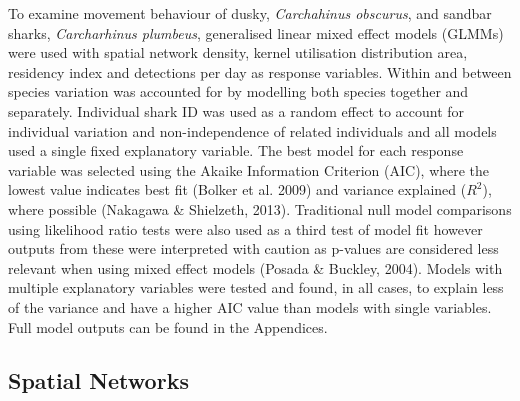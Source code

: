 \documentclass[11pt,a4paper]{article}
\begin{document}
	To examine movement behaviour of dusky, \textit{Carchahinus obscurus}, and sandbar sharks, \textit{Carcharhinus plumbeus}, generalised linear mixed effect models (GLMMs) were used with spatial network density, kernel utilisation distribution area, residency index and detections per day as response variables. Within and between species variation was accounted for by modelling both species together and separately. Individual shark ID was used as a random effect to account for individual variation and non-independence of related individuals and all models used a single fixed explanatory variable. The best model for each response variable was selected using the Akaike Information Criterion (AIC), where the lowest value indicates best fit (Bolker et al. 2009) and variance explained ($R^2$), where possible (Nakagawa \& Shielzeth, 2013). Traditional null model comparisons using likelihood ratio tests were also used as a third test of model fit however outputs from these were interpreted with caution as p-values are considered less relevant when using mixed effect models (Posada \& Buckley, 2004). Models with multiple explanatory variables were tested and found, in all cases, to explain less of the variance and have a higher AIC value than models with single variables. Full model outputs can be found in the Appendices. 
	
	
	\subsection{Spatial Networks}
	
\end{document}

